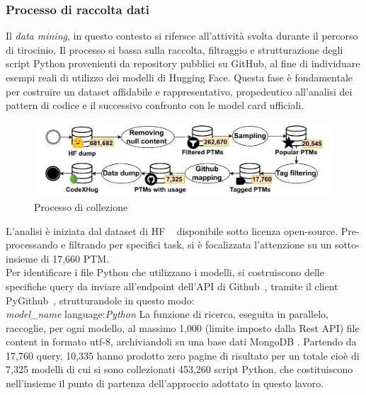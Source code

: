 \documentclass{article}
\begin{document}
\subsubsection{Processo di raccolta dati} \label{tirocinio}
Il \textit{data mining}, in questo contesto si rifersce all'attività svolta durante il percorso di tirocinio. Il processo si bassa sulla raccolta, filtraggio e strutturazione degli script Python provenienti da repository pubblici su GitHub, al fine di individuare esempi reali di utilizzo dei modelli di Hugging Face. Questa fase è fondamentale per costruire un dataset affidabile e rappresentativo, propedeutico all'analisi dei pattern di codice e il successivo confronto con le model card ufficiali.
\begin{figure}[htbp]
    \centering
    \includegraphics[width=.9\linewidth]{img/data_collection.pdf}
    \caption{Processo di collezione~\cite{CodeXHug}}
    \label{fig:tirocinio}
\end{figure}
L'analisi è iniziata dal dataset di HF ~\cite{ait_hfcommunity_2023} disponibile sotto licenza open-source. Pre-processando e filtrando per specifici task, si è focalizzata l'attenzione su un sotto-insieme di 17,660 PTM.\\
Per identificare i file Python che utilizzano i modelli, si costruiscono delle specifiche query da inviare all'endpoint dell'API di Github~\cite{github_rest}, tramite il client PyGithub~\cite{pygithub}, strutturandole in questo modo:\\
\emph{model\_name} language:\emph{Python}
La funzione di ricerca, eseguita in parallelo, raccoglie, per ogni modello, al massimo 1,000 (limite imposto dalla Rest API) file content in formato utf-8, archiviandoli su una base dati MongoDB \cite{pymongo}. 
Partendo da 17,760 query, 10,335 hanno prodotto zero pagine di risultato per un totale cioè di 7,325 modelli di cui si sono collezionati 453,260 script Python, che costituiscono nell'insieme il punto di partenza dell'approccio adottato in questo lavoro.\\
\end{document}
